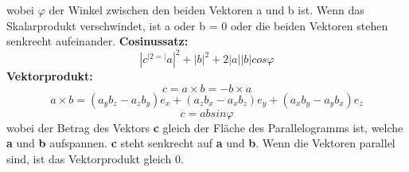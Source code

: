 \documentclass[7pt]{article}
\begin{document}
\begin{multicols*}{3}
wobei  $\varphi$ der Winkel zwischen den beiden Vektoren a und b ist. Wenn das Skalarprodukt verschwindet, ist a oder b = 0 oder die beiden Vektoren stehen senkrecht aufeinander.
\newline
\newline \textbf{Cosinussatz:}
\begin{equation*}
	|c^|{2} = |a|^{2} + |b|^{2} + 2|a||b|cos\varphi
\end{equation*}
\textbf{Vektorprodukt:}
\begin{equation*}
	c = a \times b = -b \times a
\end{equation*}
\begin{equation*}
	a \times b = (a_{y}b_{z} - a_{z}b_{y})e_{x} +  (a_{z}b_{x} - a_{x}b_{z})e_{y}	 +  (a_{x}b_{y} - a_{y}b_{x})e_{z}	
\end{equation*}
\begin{equation*}
	c = ab sin \varphi
\end{equation*}
wobei der Betrag des Vektors \textbf{c} gleich der Fläche des Parallelogramms ist, welche \textbf{a} und \textbf{b} aufspannen. \textbf{c} steht senkrecht auf \textbf{a} und \textbf{b}. Wenn die Vektoren parallel sind, ist das Vektorprodukt gleich 0. 


\
	
\end{multicols*}
\end{document}
